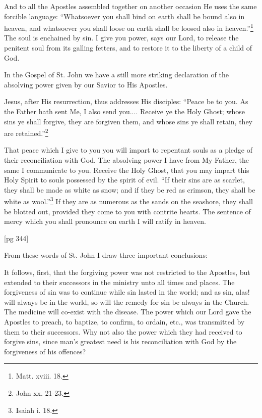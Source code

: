 And to all the Apostles assembled together on
another occasion He uses the same forcible
language: “Whatsoever you shall bind on earth
shall be bound also in heaven, and whatsoever you
shall loose on earth shall be loosed also in
heaven.”\footnote{Matt. xviii.
18.} The soul is enchained by sin. I give
you power, says our Lord, to release the penitent
soul from its galling fetters, and to restore it to
the liberty of a child of God.

In the Gospel of St. John we have a still more
striking declaration of the absolving power given
by our Savior to His Apostles.

Jesus, after His resurrection, thus addresses
His disciples: “Peace be to you. As the Father
hath sent Me, I also send you.... Receive ye
the Holy Ghost; whose sins ye shall forgive, they
are forgiven them, and whose sins ye shall retain,
they are retained.”\footnote{John xx. 21-23.}

That peace which I give to you you will impart
to repentant souls as a pledge of their reconciliation
with God. The absolving power I have from
My Father, the same I communicate to you. Receive
the Holy Ghost, that you may impart this
Holy Spirit to souls possessed by the spirit of evil.
“If their sins are as scarlet, they shall be made as
white as snow; and if they be red as crimson, they
shall be white as wool.”\footnote{Isaiah
i. 18.} If they are as numerous
as the sands on the seashore, they shall be
blotted out, provided they come to you with contrite
hearts. The sentence of mercy which you
shall pronounce on earth I will ratify in heaven.

[pg 344]

From these words of St. John I draw three important
conclusions:

It follows, first, that the forgiving power was
not restricted to the Apostles, but extended to
their successors in the ministry unto all times and
places. The forgiveness of sin was to continue
while sin lasted in the world; and as sin, alas! will
always be in the world, so will the remedy for sin
be always in the Church. The medicine will co-exist
with the disease. The power which our Lord
gave the Apostles to preach, to baptize, to confirm,
to ordain, etc., was transmitted by them to their
successors. Why not also the power which they
had received to forgive sins, since man's greatest
need is his reconciliation with God by the forgiveness
of his offences?

